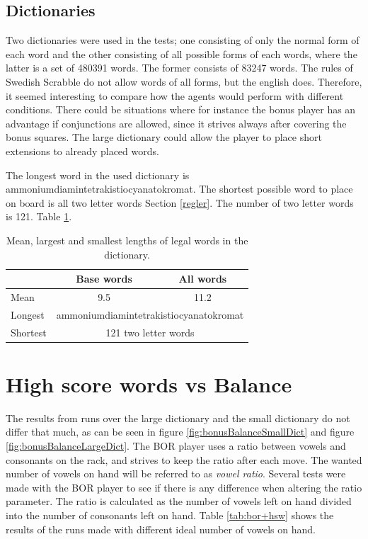 \documentclass[a4paper, 12pt]{report}
\begin{document}
\subsection{Dictionaries}
Two dictionaries were used in the tests; one consisting of only the normal form of each word and the other consisting of all possible forms of each words, where the latter is a set of 480391 words. The former consists of 83247 words. The rules of Swedish Scrabble do not allow words of all forms, but the english does. Therefore, it seemed interesting to compare how the agents would perform with different conditions. There could be situations where for instance the bonus player has an advantage if conjunctions are allowed, since it strives always after covering the bonus squares. The large dictionary could allow the player to place short extensions to already placed words.

The longest word in the used dictionary is ammoniumdiamintetrakistiocyanatokromat. The shortest possible word to place on board is all two letter words Section \ref{regler}. The number of two letter words is 121. Table \ref{table:dictionary+length}.
\begin{table}[h]
\centering
	\begin{tabular}{l | c | c}
	& Base words & All words \\
	\hline
	Mean & 9.5 & 11.2 \\
	\hline
	Longest & \multicolumn{2}{c}{ammoniumdiamintetrakistiocyanatokromat} \\
	\hline
	Shortest & \multicolumn{2}{c}{121 two letter words} \\ 
	\end{tabular}
\caption{Mean, largest and smallest lengths of legal words in the dictionary.}
\label{table:dictionary+length}
\end{table}

\section{High score words vs Balance}
\label{sec:highBalance}

The results from runs over the large dictionary and the small dictionary do not differ that much, as can be seen in figure \ref{fig:bonusBalanceSmallDict} and figure \ref{fig:bonusBalanceLargeDict}.
The BOR player uses a ratio between vowels and consonants on the rack, and strives to keep the ratio after each move. The wanted number of vowels on hand will be referred to as \emph{vowel ratio}. Several tests were made with the BOR player to see if there is any difference when altering the ratio parameter. The ratio is calculated as the number of vowels left on hand divided into the number of consonants left on hand. Table \ref{tab:bor+hsw} shows the results of the runs made with different ideal number of vowels on hand.
\end{document}
